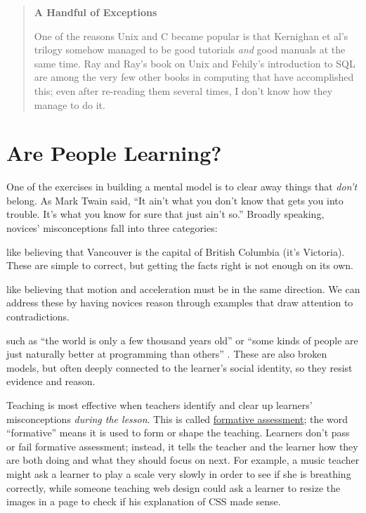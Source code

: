 \begin{quote}\setlength{\parindent}{0pt}
\textbf{A Handful of Exceptions}

One of the reasons Unix and C became popular is that Kernighan et
al's trilogy \cite{Kern1978,Kern1983,Kern1988}
somehow managed to be good tutorials \emph{and} good manuals at the same
time. Ray and Ray's book on Unix \cite{Ray2014} and Fehily's
introduction to SQL \cite{Fehi2008} are among the very few other
books in computing that have accomplished this; even after
re-reading them several times, I don't know how they manage to do
it.
\end{quote}

\section{Are People Learning?}\label{s:models-formative-assessment}

One of the exercises in building a mental model is to clear away things
that \emph{don't} belong. As Mark Twain said, ``It ain't what you don't know
that gets you into trouble. It's what you know for sure that just ain't
so.'' Broadly speaking, novices' misconceptions fall into three
categories:

\begin{description}
\tightlist
\item[Factual errors]
like believing that Vancouver is the capital of British Columbia
(it's Victoria). These are simple to correct, but getting the
facts right is not enough on its own.
\item[Broken models]
like believing that motion and acceleration must be in the same
direction. We can address these by having novices reason through
examples that draw attention to contradictions.
\item[Fundamental beliefs]
such as ``the world is only a few thousand years old'' or ``some kinds
of people are just naturally better at programming than others''
\cite{Guzd2015b,Pati2016}. These are also broken models, but
often deeply connected to the learner's social identity, so they
resist evidence and reason.
\end{description}

Teaching is most effective when teachers identify and clear up learners'
misconceptions \emph{during the lesson}. This is called
\hyperlink{g:formative-assessment}{formative assessment}; the word
``formative'' means it is used to form or shape the teaching. Learners
don't pass or fail formative assessment; instead, it tells the teacher
and the learner how they are both doing and what they should focus on
next. For example, a music teacher might ask a learner to play a scale
very slowly in order to see if she is breathing correctly, while someone
teaching web design could ask a learner to resize the images in a page
to check if his explanation of CSS made sense.

